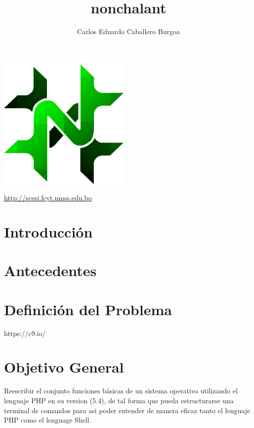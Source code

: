 \documentclass[letter,12pt]{article}
\title{\bf nonchalant}
\author{Carlos Eduardo Caballero Burgoa}
\begin{document}
\maketitle
\begin{center}\includegraphics[width=0.48\textwidth]{nonchalant.png}\end{center}
\begin{center}\url {http://scesi.fcyt.umss.edu.bo}\end{center}
\pagebreak

\tableofcontents
\pagebreak

\section{Introducción}


\section{Antecedentes}


\section{Definición del Problema}


https://c9.io/

\section{Objetivo General}
Reescribir el conjunto funciones básicas de un sistema operativo utilizando el lenguaje PHP en su version (5.4), de tal forma que pueda estructurarse una terminal de comandos para asi poder entender de manera eficaz tanto el lenguaje PHP como el lenguage Shell.
\end{document}
